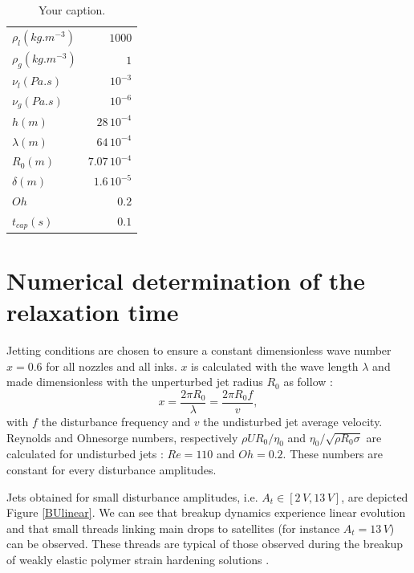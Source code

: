 \documentclass[twocolumn,10pt]{asme2ej}
\begin{document}
\begin{table}
    \begin{center}
        \begin{tabular}{lr}
            \hline
            $\rho_{l} (kg.m^{-3})$ & $1000$\\
            $\rho_{g} (kg.m^{-3})$ & $1$\\
            $\nu_{l} (Pa.s)$ & $10^{-3}$\\
            $\nu_{g} (Pa.s)$ & $10^{-6}$\\
            $h(m)$ & $28\, 10^{-4}$\\
            $\lambda (m)$ & $64\, 10^{-4}$\\
            $R_0(m)$ & $7.07\, 10^{-4}$\\
            $\delta (m)$ & $1.6\, 10^{-5}$\\
            $Oh$ & $0.2$\\
            $t_{cap}(s)$ & $0.1$  \\          
            \hline
        \end{tabular}
    \end{center}
    
    \caption{\label{tab:table-name}Your caption.}
\end{table}



\section{Numerical determination of the relaxation time} \label{numericalDetermination}





Jetting conditions are chosen to ensure a constant dimensionless wave number $x=0.6$ for all nozzles and all inks. $x$ is calculated with the wave length $\lambda$ and made dimensionless with the unperturbed jet radius $R_0$ as follow :
\begin{equation}
  x=\frac{2 \pi R_0}{\lambda}=\frac{2 \pi R_0 f}{v},
\end{equation} 
with $f$ the disturbance frequency and $v$ the undisturbed jet average velocity. Reynolds and Ohnesorge numbers, respectively $\rho U R_0 / \eta_0$ and $\eta_0/\sqrt{\rho R_0 \sigma}$ are calculated for undisturbed jets : $Re=110$ and $Oh=0.2$. These numbers are constant for every disturbance amplitudes.

Jets obtained for small disturbance amplitudes, i.e. $A_t \in [2 \, V,13 \, V]$, are  depicted Figure \ref{BUlinear}. We can see that breakup dynamics experience linear evolution and that small threads linking main drops to satellites (for instance $A_t = 13 \, V$) can be observed. These threads are typical of those observed during the breakup of weakly elastic polymer strain hardening solutions \cite{christanti2002effect}.
\end{document}
